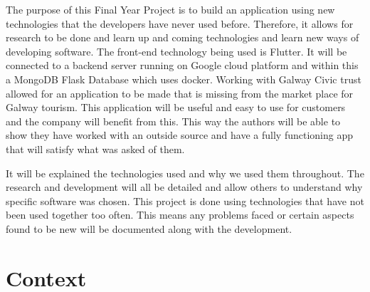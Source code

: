 The purpose of this Final Year Project is to build an application using new technologies that the developers have never used before. Therefore, it allows for research to be done and learn up and coming technologies and learn new ways of developing software. The front-end technology being used is Flutter. It will be connected to a backend server running on Google cloud platform and within this a MongoDB Flask Database which uses docker. Working with Galway Civic trust allowed for an application to be made that is missing from the market place for Galway tourism. This application will be useful and easy to use for customers and the company will benefit from this.  This way the authors will be able to show they have worked with an outside source and have a fully functioning app that will satisfy what was asked of them.


It will be explained the technologies used and why we used them throughout. The research and development will all be detailed and allow others to understand why specific software was chosen. This project is done using technologies that have not been used together too often. This means any problems faced or certain aspects found to be new will be documented along with the development.
\section{Context}
